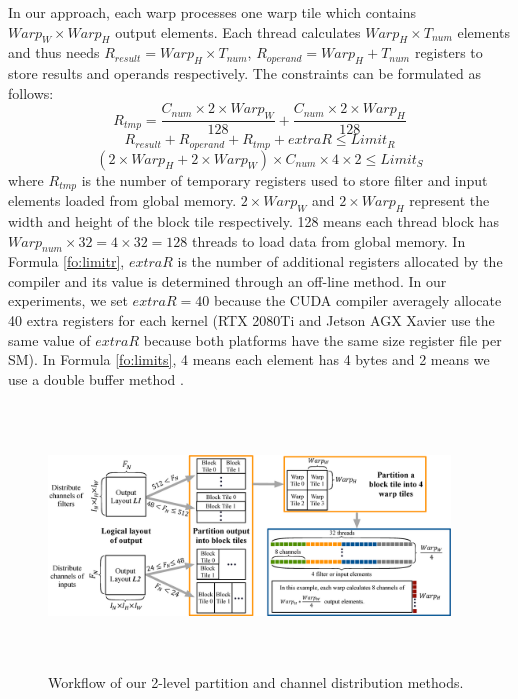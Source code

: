 In our approach, each warp processes one warp tile which contains $Warp_W \times Warp_H$ output elements.
Each thread calculates $Warp_H \times T_{num}$ elements and thus needs $R_{result}=Warp_H \times T_{num}$, $R_{operand}=Warp_H+T_{num}$ registers to store results and operands respectively.
The constraints can be formulated as follows:
\begin{equation}\nonumber
R_{tmp}=\frac{C_{num} \times 2 \times Warp_W}{128}+\frac{C_{num}  \times 2 \times Warp_H}{128}
\end{equation}
\begin{equation}
    \label{fo:limitr}
R_{result}+R_{operand}+R_{tmp}+extraR \leq Limit_R
\end{equation}
\begin{equation}
    \label{fo:limits}
(2 \times Warp_H+2 \times Warp_W)\times C_{num} \times 4 \times 2 \leq Limit_S
\end{equation}
where $R_{tmp}$ is the number of temporary registers used to store filter and input elements loaded from global memory.
$2 \times Warp_W$ and $2 \times Warp_H$ represent the width and height of the block tile respectively. 128 means each thread block has $Warp_{num} \times 32 = 4 \times 32=128$ threads to load data from global memory.
In Formula \ref{fo:limitr}, $extraR$ is the number of additional registers allocated by the compiler and its value is determined through an off-line method. {\color{red}In our experiments, we set $extraR=40$ because the CUDA compiler averagely allocate 40 extra registers for each kernel (RTX 2080Ti and Jetson AGX Xavier use the same value of $extraR$ because both platforms have the same size register file per SM).} In Formula \ref{fo:limits}, 4 means each element has 4 bytes and 2 means we use a double buffer method \cite{abdelfattah2019fast,nichols2019magmadnn}.
\begin{figure}
	\centering
    \includegraphics[width=0.95\textwidth,height=7cm]{./figure/pwworkflow.eps}
    \vspace{-3mm}
    \caption{Workflow of our 2-level partition and channel distribution methods.} \label{fig:pwworkflow}
\end{figure}
